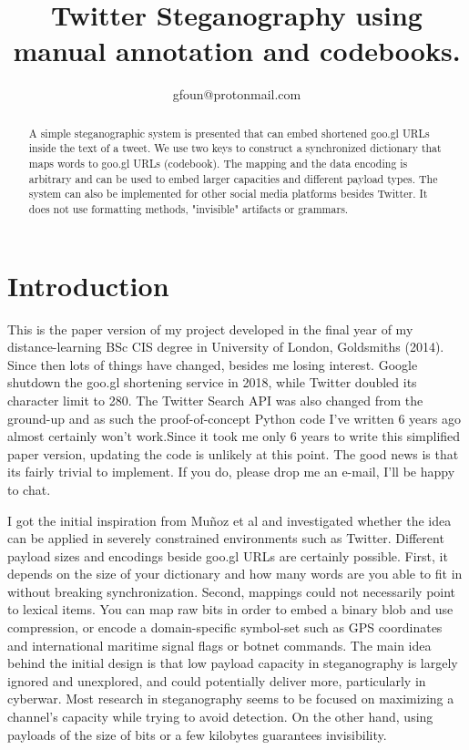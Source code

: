 \documentclass[]{article}
\title{Twitter Steganography using manual annotation and codebooks.}
\author{gfoun@protonmail.com}
\date{}
\begin{document}
\maketitle

\begin{abstract}
	A simple steganographic system is presented that can embed shortened goo.gl URLs inside the text of a tweet. We use two keys to construct a synchronized dictionary that maps words to goo.gl URLs (codebook). The mapping and the data encoding is arbitrary and can be used to embed larger capacities and different payload types. The system can also be implemented for other social media platforms besides Twitter. It does not use formatting methods, "invisible" artifacts or grammars.
\end{abstract}
\section{Introduction}
This is the paper version of my project developed in the final year of my distance-learning BSc CIS degree in University of London, Goldsmiths (2014). Since then lots of things have changed, besides me losing interest. Google shutdown the goo.gl shortening service in 2018, while Twitter doubled its character limit to 280. The Twitter Search API was also changed from the ground-up and as such the proof-of-concept Python code I've written 6 years ago almost certainly won't work.\newline Since it took me only 6 years to write this simplified paper version, updating the code is unlikely at this point. The good news is that its fairly trivial to implement. If you do, please drop me an e-mail, I'll be happy to chat.

I got the initial inspiration from Mu{\~n}oz et al\cite{munoz} and investigated whether the idea can be applied in severely constrained environments such as Twitter. Different payload sizes and encodings beside goo.gl URLs are certainly possible. First, it depends on the size of your dictionary and how many words are you able to fit in without breaking synchronization. Second, mappings could not necessarily point to lexical items. You can map raw bits in order to embed a binary blob and use compression, or encode a domain-specific symbol-set such as GPS coordinates and international maritime signal flags or botnet commands. \newline The main idea behind the initial design is that low payload capacity in steganography is largely ignored and unexplored, and could potentially deliver more, particularly in cyberwar. Most research in steganography seems to be focused on maximizing a channel's capacity while trying to avoid detection. \newline On the other hand, using payloads of the size of bits or a few kilobytes guarantees invisibility.
\newpage
\end{document}
